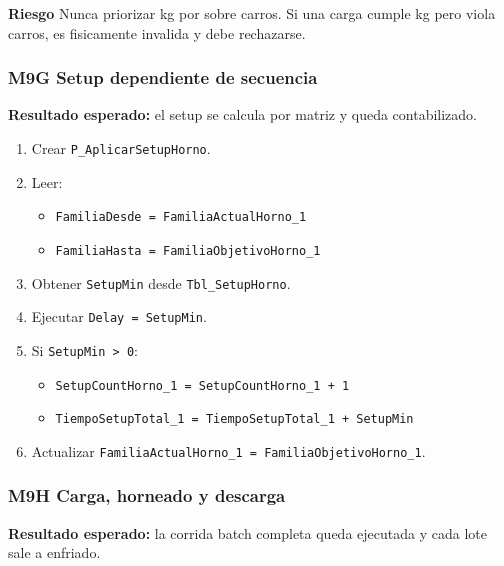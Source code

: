 \documentclass[11pt]{article}
\newcommand{\simio}[1]{\texttt{#1}}
\newcommand{\tabla}[1]{\texttt{#1}}
\newcommand{\state}[1]{\texttt{#1}}
\newcommand{\proc}[1]{\texttt{#1}}
\newcommand{\risk}{\textcolor{rojoriesgo}{\textbf{Riesgo}}}
\begin{document}
\risk{} Nunca priorizar kg por sobre carros. Si una carga cumple kg pero viola carros, es fisicamente invalida y debe rechazarse.

\subsubsection{M9G Setup dependiente de secuencia}
\textbf{Resultado esperado:} el setup se calcula por matriz y queda contabilizado.

\begin{enumerate}
  \item Crear \proc{P\_AplicarSetupHorno}.
  \item Leer:
  \begin{itemize}
    \item \state{FamiliaDesde = FamiliaActualHorno\_1}
    \item \state{FamiliaHasta = FamiliaObjetivoHorno\_1}
  \end{itemize}
  \item Obtener \state{SetupMin} desde \tabla{Tbl\_SetupHorno}.
  \item Ejecutar \simio{Delay = SetupMin}.
  \item Si \state{SetupMin > 0}:
  \begin{itemize}
    \item \state{SetupCountHorno\_1 = SetupCountHorno\_1 + 1}
    \item \state{TiempoSetupTotal\_1 = TiempoSetupTotal\_1 + SetupMin}
  \end{itemize}
  \item Actualizar \state{FamiliaActualHorno\_1 = FamiliaObjetivoHorno\_1}.
\end{enumerate}

\subsubsection{M9H Carga, horneado y descarga}
\textbf{Resultado esperado:} la corrida batch completa queda ejecutada y cada lote sale a enfriado.
\end{document}
